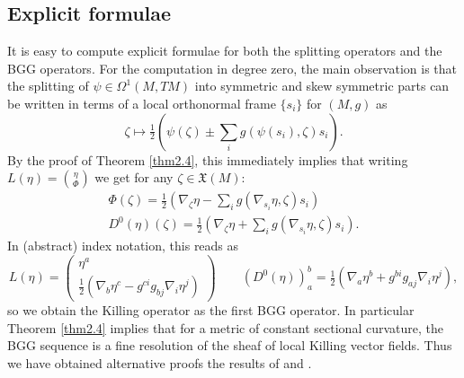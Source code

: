 \documentclass[12pt,a4paper]{amsart}
\def\frak{\mathfrak}
\newcommand{\ps}{\psi}
\newcommand{\ze}{\zeta}
\newcommand{\Om}{\Omega}
\numberwithin{theorem}{section}
\numberwithin{equation}{section}
\theoremstyle{definition}
\theoremstyle{remark}
\begin{document}
 \subsection{Explicit formulae}\label{2.6}
 It is easy to compute explicit formulae for both the splitting operators and the BGG
 operators. For the computation in degree zero, the main observation is that the
 splitting of $\psi\in\Om^1(M,TM)$ into symmetric and skew symmetric parts can be
 written in terms of a local orthonormal frame $\{s_i\}$ for $(M,g)$ as
 $$
 \ze\mapsto \tfrac{1}{2}\left(\ps(\zeta)\pm \textstyle\sum_ig(\ps(s_i),\ze)s_i\right).
 $$
 By the proof of Theorem \ref{thm2.4}, this immediately implies that writing
 $L(\eta)=\binom{\eta}{\Phi}$ we get for any $\ze\in\frak X(M)$:
 \begin{gather}\label{L0}
   \Phi(\zeta)=\tfrac12\left(\nabla_\ze \eta-
     \textstyle\sum_ig(\nabla_{s_i}\eta,\ze)s_i\right)\\
   \label{D0}
   D^0(\eta)(\zeta)=\tfrac12\left(\nabla_\ze \eta+
     \textstyle\sum_ig(\nabla_{s_i}\eta,\ze)s_i\right).
   \end{gather} 
   In (abstract) index notation, this reads as
   $$
L(\eta)=\begin{pmatrix}  \eta^a \\ \frac12(\nabla_b\eta^c-g^{ci}g_{bj}\nabla_i\eta^j )
\end{pmatrix} \qquad
(D^0(\eta))_a^b=\tfrac12(\nabla_a\eta^b+g^{bi}g_{aj}\nabla_i\eta^j), 
$$
so we obtain the Killing operator as the first BGG operator. In particular Theorem
\ref{thm2.4} implies that for a metric of constant sectional curvature, the BGG
sequence is a fine resolution of the sheaf of local Killing vector fields. Thus we
have obtained alternative proofs the results of \cite{Calabi} and \cite{BBL}. 

\medskip
\end{document}
